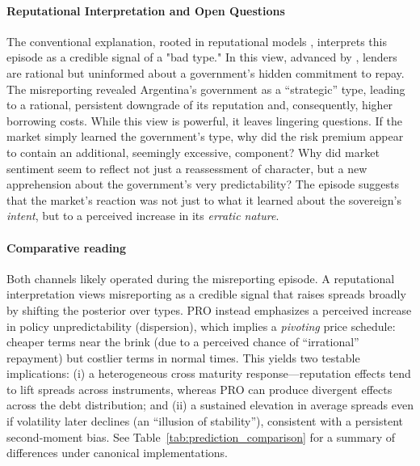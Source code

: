 \documentclass[12pt]{article}
\theoremstyle{plain}
\begin{document}
\paragraph{Reputational Interpretation and Open Questions}
The conventional explanation, rooted in reputational models
\citet{ColeDowEnglish1995}, interprets this episode as a credible signal of a
"bad type." In this view, advanced by \citet{MorelliMoretti2023}, lenders are
rational but uninformed about a government's hidden commitment to repay. The
misreporting revealed Argentina's government as a ``strategic'' type, leading
to a rational, persistent downgrade of its reputation and, consequently, higher
borrowing costs. While this view is powerful, it leaves lingering questions. If
the market simply learned the government's type, why did the risk premium
appear to contain an additional, seemingly excessive, component? Why did market
sentiment seem to reflect not just a reassessment of character, but a new
apprehension about the government's very predictability? The episode suggests
that the market's reaction was not just to what it learned about the
sovereign's \textit{intent}, but to a perceived increase in its \textit{erratic
	nature}.

\paragraph{Comparative reading} Both channels likely operated during the misreporting episode. A reputational
interpretation views misreporting as a credible signal that raises spreads
broadly by shifting the posterior over types. PRO instead emphasizes a
perceived increase in policy unpredictability (dispersion), which implies a
\emph{pivoting} price schedule: cheaper terms near the brink (due to a
perceived chance of “irrational” repayment) but costlier terms in normal times.
This yields two testable implications: (i) a heterogeneous cross maturity
response—reputation effects tend to lift spreads across instruments, whereas
PRO can produce divergent effects across the debt distribution; and (ii) a
sustained elevation in average spreads even if volatility later declines (an
“illusion of stability”), consistent with a persistent second‑moment bias. See
Table~\ref{tab:prediction_comparison} for a summary of differences under
canonical implementations.
\end{document}
